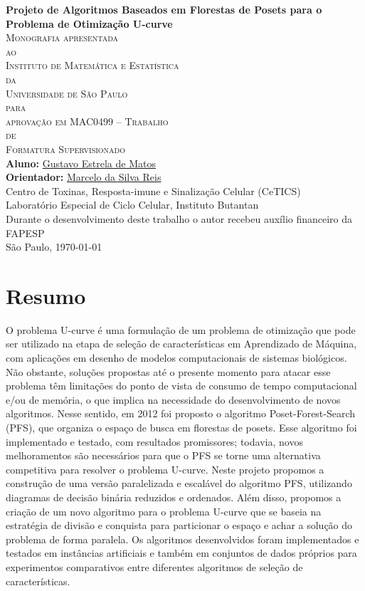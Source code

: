 \documentclass[12pt, twoside]{report}
\numberwithin{mydefinition}{section}
\numberwithin{mytheorem}{section}
\numberwithin{mylemma}{section}
\numberwithin{corollary}{section}
\begin{document}
\thispagestyle{empty}
\begin{center}
{\Large
{\bf Projeto de Algoritmos Baseados em Florestas de Posets para o 
     Problema de Otimização U-curve}\\
\bigskip
\bigskip
\bigskip
\textsc{
    Monografia apresentada\\[-0.25cm] 
    ao\\[-0.25cm]
    Instituto de Matemática e Estatística\\[-0.25cm]
    da\\[-0.25cm]
    Universidade de São Paulo\\[-0.25cm]
    para\\[-0.25cm]
    aprovação em MAC0499 -- Trabalho\\[-0.25cm]
    de\\[-0.25cm]
    Formatura Supervisionado}\\
\bigskip
\bigskip
\bigskip
{\bf Aluno:} \href{mailto:gustavo.estrela.matos@gmail.com}{Gustavo Estrela de Matos}\\
\bigskip
{\bf Orientador:} \href{mailto:marcelo.reis@butantan.gov.br}{Marcelo da Silva Reis}\\
\bigskip
\bigskip
\bigskip
Centro de Toxinas, Resposta-imune e Sinalização Celular (CeTICS)\\
\bigskip
Laboratório Especial de Ciclo Celular, Instituto Butantan\\
\bigskip
\bigskip
\bigskip
{\normalsize Durante o desenvolvimento deste trabalho o autor recebeu
    auxílio financeiro da FAPESP}\\
\bigskip
\bigskip
\bigskip
São Paulo, \today
}
\end{center}
\newpage

\chapter*{Resumo}
O problema U-curve é uma formulação de um problema de otimização que 
pode ser utilizado na etapa de seleção de características em Aprendizado
de Máquina, com aplicações em desenho de modelos computacionais de 
sistemas biológicos. Não obstante, soluções propostas até o presente 
momento para atacar esse problema têm limitações do ponto de vista de 
consumo de tempo computacional e/ou de memória, o que implica na 
necessidade do desenvolvimento de novos algoritmos. Nesse sentido, em 
2012 foi proposto o algoritmo Poset-Forest-Search (PFS), que organiza o
espaço de busca em florestas de posets. Esse algoritmo foi implementado 
e testado, com resultados promissores; todavia, novos melhoramentos são
necessários para que o PFS se torne uma alternativa competitiva para 
resolver o problema U-curve. Neste projeto propomos a construção de uma 
versão paralelizada e escalável do algoritmo PFS, utilizando diagramas 
de decisão binária reduzidos e ordenados. Além disso, propomos a criação
de um novo algoritmo para o problema U-curve que se baseia na estratégia
de divisão e conquista para particionar o espaço e achar a solução do
problema de forma paralela. Os algoritmos desenvolvidos foram 
implementados e testados em instâncias artificiais e também em 
conjuntos de dados próprios para experimentos comparativos entre 
diferentes algoritmos de seleção de características.
\end{document}
